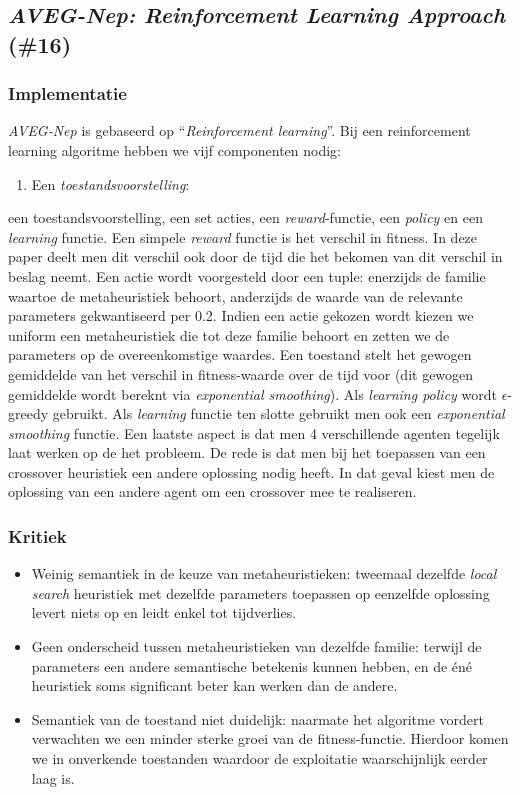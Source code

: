 \subsection{\emph{AVEG-Nep: Reinforcement Learning Approach} (\#16)}
\label{sss:aveg-nep}
\subsubsection{Implementatie}
\emph{AVEG-Nep}\cite{chesc-aveg-nep} is gebaseerd op ``\emph{Reinforcement learning}''\cite{rlaiacaml}. Bij een reinforcement learning algoritme hebben we vijf componenten nodig:
\begin{enumerate}
 \item Een \emph{toestandsvoorstelling}:
\end{enumerate}
een toestandsvoorstelling, een set acties, een \emph{reward}-functie, een \emph{policy} en een \emph{learning} functie. Een simpele \emph{reward} functie is het verschil in fitness. In deze paper deelt men dit verschil ook door de tijd die het bekomen van dit verschil in beslag neemt. Een actie wordt voorgesteld door een tuple: enerzijds de familie waartoe de metaheuristiek behoort, anderzijds de waarde van de relevante parameters gekwantiseerd per 0.2. Indien een actie gekozen wordt kiezen we uniform een metaheuristiek die tot deze familie behoort en zetten we de parameters op de overeenkomstige waardes. Een toestand stelt het gewogen gemiddelde van het verschil in fitness-waarde over de tijd voor (dit gewogen gemiddelde wordt bereknt via \emph{exponential smoothing}). Als \emph{learning policy} wordt $\epsilon$-greedy 
gebruikt. Als \emph{learning} functie ten slotte gebruikt men ook een \emph{exponential smoothing} functie. Een laatste aspect is dat men 4 verschillende agenten tegelijk laat werken op de het probleem. De rede is dat men bij het toepassen van een crossover heuristiek een andere oplossing nodig heeft. In dat geval kiest men de oplossing van een andere agent om een crossover mee te realiseren.
\subsubsection{Kritiek}
\begin{itemize}
 \item Weinig semantiek in de keuze van metaheuristieken: tweemaal dezelfde \emph{local search} heuristiek met dezelfde parameters toepassen op eenzelfde oplossing levert niets op en leidt enkel tot tijdverlies.
 \item Geen onderscheid tussen metaheuristieken van dezelfde familie: terwijl de parameters een andere semantische betekenis kunnen hebben, en de \'en\'e heuristiek soms significant beter kan werken dan de andere.
 \item Semantiek van de toestand niet duidelijk: naarmate het algoritme vordert verwachten we een minder sterke groei van de fitness-functie. Hierdoor komen we in onverkende toestanden waardoor de exploitatie waarschijnlijk eerder laag is.
\end{itemize}
